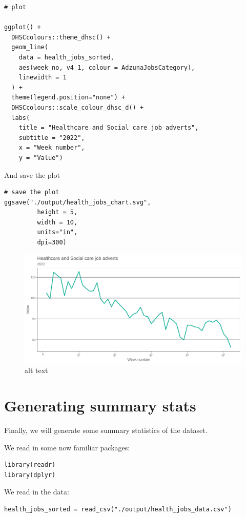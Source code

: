 \documentclass[
]{book}
\begin{document}
\begin{verbatim}
# plot

ggplot() +
  DHSCcolours::theme_dhsc() +
  geom_line(
    data = health_jobs_sorted,
    aes(week_no, v4_1, colour = AdzunaJobsCategory),
    linewidth = 1
  ) +
  theme(legend.position="none") +
  DHSCcolours::scale_colour_dhsc_d() +
  labs(
    title = "Healthcare and Social care job adverts",
    subtitle = "2022",
    x = "Week number",
    y = "Value")
\end{verbatim}

And save the plot

\begin{verbatim}
# save the plot
ggsave("./output/health_jobs_chart.svg",
         height = 5,
         width = 10,
         units="in",
         dpi=300)
\end{verbatim}

\begin{figure}
\centering
\includegraphics{health_jobs_chart.svg}
\caption{alt text}
\end{figure}

\hypertarget{generating-summary-stats}{%
\section{Generating summary stats}\label{generating-summary-stats}}

Finally, we will generate some summary statistics of the dataset.

We read in some now familiar packages:

\begin{verbatim}
library(readr)
library(dplyr)
\end{verbatim}

We read in the data:

\begin{verbatim}
health_jobs_sorted = read_csv("./output/health_jobs_data.csv")
\end{verbatim}
\end{document}
